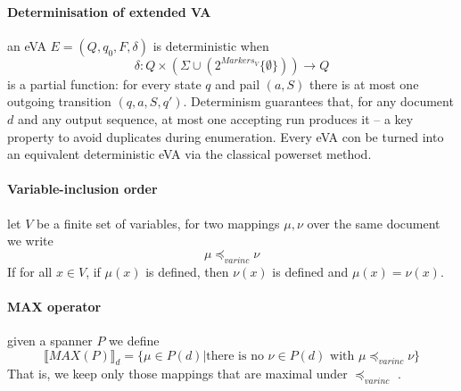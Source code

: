 \paragraph{Determinisation of extended VA} an eVA $E = (Q, q_0, F, \delta)$ is deterministic when
$$
\delta : Q \times (\Sigma \cup (2^{Markers_V}\{\emptyset\}))\rightarrow Q
$$
is a partial function: for every state $q$ and pail $(a,S)$ there is at most one outgoing transition $(q,a,S,q')$. Determinism guarantees that, for any document $d$ and any output sequence, at most one accepting run produces it – a key property to avoid duplicates during enumeration.
Every eVA con be turned into an equivalent deterministic eVA via the classical powerset method.

\paragraph{Variable-inclusion order} let  $V$ be a finite set of variables, for two mappings $\mu, \nu$ over the same document we write
$$
\mu \preccurlyeq_{var inc } \nu
$$
If for all $x \in V$, if $\mu(x)$ is defined, then $\nu(x)$ is defined and  $\mu(x) = \nu(x)$.

\paragraph{MAX operator} given a spanner $P$ we define
$$
\llbracket MAX(P)\rrbracket_d = \{ \mu \in P(d) | \text{there is no } \nu \in P(d) \text{ with } \mu \preccurlyeq_{var inc } \nu \}
$$
That is, we keep only those mappings that are maximal under $\preccurlyeq_{var inc }$ \cite{BucchiGQRV22}. 
  